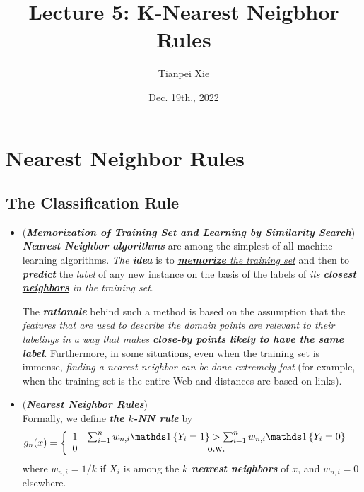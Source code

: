 \documentclass[11pt]{article}
\begin{document}
\title{Lecture 5: K-Nearest Neigbhor Rules}
\author{ Tianpei Xie}
\date{ Dec. 19th., 2022 }
\maketitle
\tableofcontents
\newpage
\section{Nearest Neighbor Rules}
\subsection{The Classification Rule}
\begin{itemize}
\item \begin{remark} (\emph{\textbf{Memorization of Training Set and Learning by Similarity Search}})\\
\emph{\textbf{Nearest Neighbor algorithms}} are among the simplest of all machine learning algorithms.  \emph{The \textbf{idea}} is to \underline{\emph{\textbf{memorize} the training set}} and then to \emph{\textbf{predict}} the \emph{label} of any new instance on the basis of the labels of \emph{its \underline{\textbf{closest neighbors}} in the training set}. 

The \emph{\textbf{rationale}} behind such a method is based on the assumption that the \emph{features that are used to describe the domain points are relevant to their labelings in a way that makes \textbf{\underline{close-by points likely to have the same label}}}. Furthermore, in some situations, even when the training set is immense, \emph{finding a nearest neighbor can be done extremely fast} (for example, when the training set is the entire Web and distances are based on links).
\end{remark}


\item \begin{definition} (\emph{\textbf{Nearest Neighbor Rules}})\\
Formally, we define \underline{\emph{\textbf{the $k$-NN rule}}} by
\begin{align*}
g_n(x) &= \left\{\begin{array}{cc}
1 & \sum_{i=1}^{n}w_{n,i}\ind{Y_i = 1} > \sum_{i=1}^{n}w_{n,i}\ind{Y_i = 0}\\
0 & \text{o.w.}
\end{array}
\right.
\end{align*} where $w_{n,i} = 1/ k$ if $X_i$ is among the \emph{\textbf{$k$ nearest neighbors}} of $x$, and $w_{n,i} = 0$ elsewhere. 


\end{definition}
\end{itemize}
\end{document}
